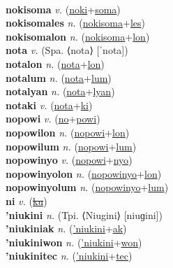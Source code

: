  \label{nokilwel} \\
\textbf{nokisoma} \textit{v.} (\hyperref[noki]{noki}+\hyperref[soma]{soma})
 \label{nokisoma} \\
\textbf{nokisomales} \textit{n.} (\hyperref[nokisoma]{nokisoma}+\hyperref[les]{les})
 \label{nokisomales} \\
\textbf{nokisomalon} \textit{n.} (\hyperref[nokisoma]{nokisoma}+\hyperref[lon]{lon})
 \label{nokisomalon} \\
\textbf{nota} \textit{v.} (Spa. ⟨nota⟩ [ˈnota])
 \label{nota} \\
\textbf{notalon} \textit{n.} (\hyperref[nota]{nota}+\hyperref[lon]{lon})
 \label{notalon} \\
\textbf{notalum} \textit{n.} (\hyperref[nota]{nota}+\hyperref[lum]{lum})
 \label{notalum} \\
\textbf{notalyan} \textit{n.} (\hyperref[nota]{nota}+\hyperref[lyan]{lyan})
 \label{notalyan} \\
\textbf{notaki} \textit{v.} (\hyperref[nota]{nota}+\hyperref[ki]{ki})
 \label{notaki} \\
\textbf{nopowi} \textit{v.} (\hyperref[no]{no}+\hyperref[powi]{powi})
 \label{nopowi} \\
\textbf{nopowilon} \textit{n.} (\hyperref[nopowi]{nopowi}+\hyperref[lon]{lon})
 \label{nopowilon} \\
\textbf{nopowilum} \textit{n.} (\hyperref[nopowi]{nopowi}+\hyperref[lum]{lum})
 \label{nopowilum} \\
\textbf{nopowinyo} \textit{v.} (\hyperref[nopowi]{nopowi}+\hyperref[nyo]{nyo})
 \label{nopowinyo} \\
\textbf{nopowinyolon} \textit{n.} (\hyperref[nopowinyo]{nopowinyo}+\hyperref[lon]{lon})
 \label{nopowinyolon} \\
\textbf{nopowinyolum} \textit{n.} (\hyperref[nopowinyo]{nopowinyo}+\hyperref[lum]{lum})
 \label{nopowinyolum} \\
\textbf{ni} \textit{v.} (\hyperref[ku]{\sout{ku}})
 \label{ni} \\
\textbf{'niukini} \textit{n.} (Tpi. ⟨Niugini⟩ [niuɡini])
 \label{'niukini} \\
\textbf{'niukiniak} \textit{n.} (\hyperref['niukini]{'niukini}+\hyperref[ak]{ak})
 \label{'niukiniak} \\
\textbf{'niukiniwon} \textit{n.} (\hyperref['niukini]{'niukini}+\hyperref[won]{won})
 \label{'niukiniwon} \\
\textbf{'niukinitec} \textit{n.} (\hyperref['niukini]{'niukini}+\hyperref[tec]{tec})
 \label{'niukinitec} \\
